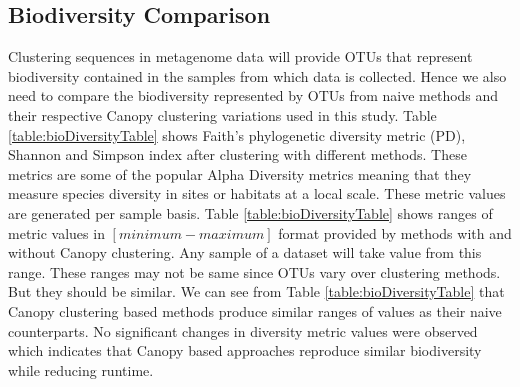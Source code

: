 \documentclass[10pt, conference, compsocconf]{IEEEtran}
\begin{document}
\subsection{\textbf{Biodiversity Comparison}} Clustering sequences in metagenome data will provide OTUs that represent biodiversity contained in the samples from which data is collected. Hence we also need to compare the biodiversity represented by OTUs from naive methods and their respective Canopy clustering variations used in this study. Table \ref{table:bioDiversityTable} shows Faith’s phylogenetic diversity metric (PD), Shannon and Simpson index after clustering with different methods. These metrics are some of the popular Alpha Diversity metrics meaning that they measure species diversity in sites or habitats at a local scale. These metric values are generated per sample basis. Table \ref{table:bioDiversityTable} shows ranges of metric values in $[minimum-maximum]$ format provided by methods with and without Canopy clustering. Any sample of a dataset will take value from this range. These ranges may not be same since OTUs vary over clustering methods. But they should be similar. We can see from Table \ref{table:bioDiversityTable} that Canopy clustering based methods produce similar ranges of values as their naive counterparts. No significant changes in diversity metric values were observed which indicates that Canopy based approaches reproduce similar biodiversity while reducing runtime.          
\end{document}
